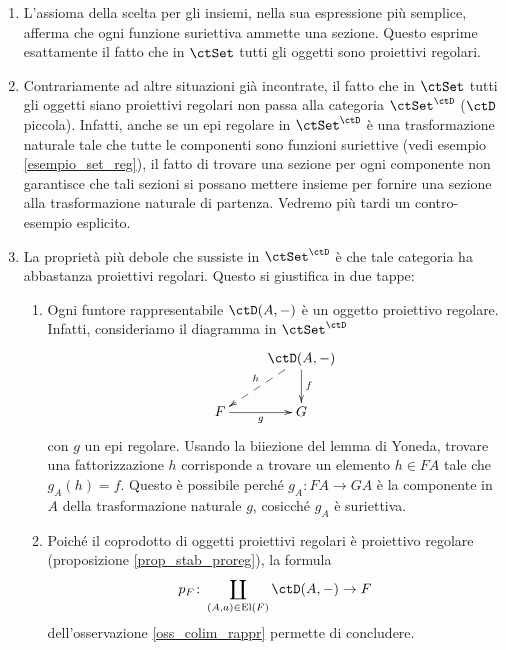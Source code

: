 \begin{examples}\label{exem_proreg}
 \hfill
 \begin{enumerate}
  \item L'assioma della scelta per gli insiemi, nella sua espressione più semplice, afferma che ogni funzione suriettiva ammette
        una sezione. Questo esprime esattamente il fatto che in \(\ctSet\) tutti gli oggetti sono proiettivi regolari.
  \item Contrariamente ad altre situazioni già incontrate, il fatto che in \(\ctSet\) tutti gli oggetti siano proiettivi regolari non passa
        alla categoria \(\ctSet^{\ctD}\) (\(\ctD\) piccola). Infatti, anche se un epi regolare in \(\ctSet^{\ctD}\) è una trasformazione naturale
        tale che tutte le componenti sono funzioni suriettive (vedi esempio \ref{esempio_set_reg}), il fatto di trovare una sezione per ogni
        componente non garantisce che tali sezioni si possano mettere insieme per fornire una sezione alla trasformazione naturale di
        partenza. Vedremo più tardi un contro-esempio esplicito.
  \item La proprietà più debole che sussiste in \(\ctSet^{\ctD}\) è che tale categoria ha abbastanza proiettivi regolari.
        Questo si giustifica in due tappe:
        \begin{enumerate}
         \item Ogni funtore rappresentabile \(\ctD(A,-)\) è un oggetto proiettivo regolare.
               Infatti, consideriamo il diagramma in \(\ctSet^{\ctD}\)
               \[\xymatrix{ & \ctD(A,-) \ar@{-->}[ld]_{h} \ar[d]^{f} \\
                F \ar[r]_-{g} & G}\]
               con \(g\) un epi regolare. Usando la biiezione del lemma di Yoneda, trovare una fattorizzazione \(h\) corrisponde a trovare
               un elemento \(h \in FA\) tale che \(g_A(h)=f\). Questo è possibile perché \(g_A \colon FA \to GA\) è la componente in \(A\)
               della trasformazione naturale \(g\), cosicché \(g_A\) è suriettiva.
         \item Poiché il coprodotto di oggetti proiettivi regolari è proiettivo regolare (proposizione \ref{prop_stab_proreg}), la formula
               \[p_F \colon \cop_{(A,a) \in \mathrm{El}(F)}\ctD(A,-) \to F\]
               dell'osservazione \ref{oss_colim_rappr} permette di concludere.
        \end{enumerate}
 \end{enumerate}
\end{examples}

